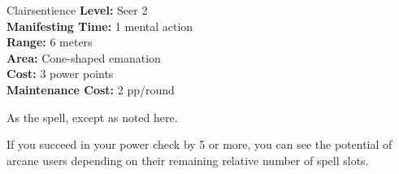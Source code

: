 {Clairsentience}
{
	\textbf{Level:}
	Seer 2\\
	\textbf{Manifesting Time:}
	1 mental action\\
	\textbf{Range:}
	6 meters\\
	\textbf{Area:}
	Cone-shaped emanation\\
	\textbf{Cost:}
	3 power points\\
	\textbf{Maintenance Cost:}
	2 pp/round\\
}
{
	As the  spell, except as noted here.

	If you succeed in your power check by 5 or more, you can see the potential of arcane users depending on their remaining relative number of spell slots.

}